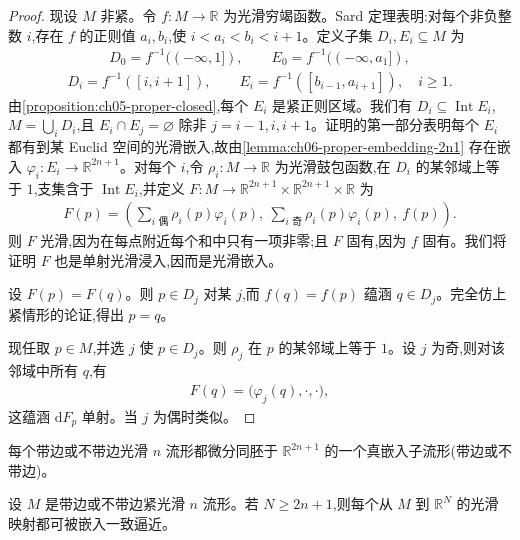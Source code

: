 \documentclass[../../main.tex]{subfiles}
\begin{document}
\begin{proof}
现设 $M$ 非紧。令 $f:M\to\mathbb{R}$ 为光滑穷竭函数。Sard 定理表明:对每个非负整数 $i$,存在 $f$ 的正则值 $a_i,b_i$,使 $i<a_i<b_i<i+1$。定义子集 $D_i,E_i\subseteq M$ 为
\begin{align*}
D_0=f^{-1}((-\infty,1]),\qquad E_0=f^{-1}((-\infty,a_1]),
\end{align*}
\begin{align*}
D_i=f^{-1}([i,i+1]),\qquad E_i=f^{-1}([b_{i-1},a_{i+1}]),\quad i\geqslant 1.
\end{align*}
由\cref{proposition:ch05-proper-closed},每个 $E_i$ 是紧正则区域。我们有 $D_i\subseteq\operatorname{Int}E_i$, $M=\bigcup_i D_i$,且 $E_i\cap E_j=\varnothing$ 除非 $j=i-1,i,i+1$。证明的第一部分表明每个 $E_i$ 都有到某 Euclid 空间的光滑嵌入,故由\cref{lemma:ch06-proper-embedding-2n1} 存在嵌入 $\varphi_i:E_i\to\mathbb{R}^{2n+1}$。对每个 $i$,令 $\rho_i:M\to\mathbb{R}$ 为光滑鼓包函数,在 $D_i$ 的某邻域上等于 $1$,支集含于 $\operatorname{Int}E_i$,并定义 $F:M\to\mathbb{R}^{2n+1}\times\mathbb{R}^{2n+1}\times\mathbb{R}$ 为
\begin{align*}
F(p)=\left(\sum_{i\text{ 偶}}\rho_i(p)\varphi_i(p),\ \sum_{i\text{ 奇}}\rho_i(p)\varphi_i(p),\ f(p)\right).
\end{align*}
则 $F$ 光滑,因为在每点附近每个和中只有一项非零;且 $F$ 固有,因为 $f$ 固有。我们将证明 $F$ 也是单射光滑浸入,因而是光滑嵌入。

设 $F(p)=F(q)$。则 $p\in D_j$ 对某 $j$,而 $f(q)=f(p)$ 蕴涵 $q\in D_j$。完全仿上紧情形的论证,得出 $p=q$。

现任取 $p\in M$,并选 $j$ 使 $p\in D_j$。则 $\rho_j$ 在 $p$ 的某邻域上等于 $1$。设 $j$ 为奇,则对该邻域中所有 $q$,有
\begin{align*}
F(q)=\bigl(\varphi_j(q),\cdot,\cdot\bigr),
\end{align*}
这蕴涵 $\mathrm{d}F_p$ 单射。当 $j$ 为偶时类似。
\end{proof}

\begin{corollary}\label{corollary:ch06-diffeomorphic-embedded}
每个带边或不带边光滑 $n$ 流形都微分同胚于 $\mathbb{R}^{2n+1}$ 的一个真嵌入子流形(带边或不带边)。
\end{corollary}

\begin{corollary}\label{corollary:ch06-approximate-embedding}
设 $M$ 是带边或不带边紧光滑 $n$ 流形。若 $N\geqslant 2n+1$,则每个从 $M$ 到 $\mathbb{R}^N$ 的光滑映射都可被嵌入一致逼近。
\end{corollary}
\end{document}
